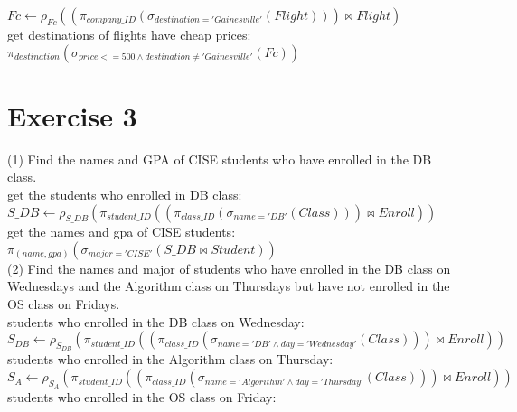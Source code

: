 \documentclass[]{article}
\begin{document}
	$Fc\leftarrow \rho_{Fc}((\pi_{company\_ID}(\sigma_{destination='Gainesville'}(Flight)))\bowtie Flight)$\\
	
	get destinations of flights have cheap prices:\\
	
	$\pi_{destination}(\sigma_{price<=500\wedge destination\neq'Gainesville'}(Fc))$\\
	
	\clearpage
	\section{Exercise 3}
	
	\noindent(1) Find the names and GPA of CISE students who have enrolled in the DB class.\\
	
	get the students who enrolled in DB class:\\
	
	$S\_DB\leftarrow \rho_{S\_DB}(\pi_{student\_ID}((\pi_{class\_ID}(\sigma_{name='DB'}(Class)))\bowtie Enroll))$\\
	
	get the names and gpa of CISE students:\\
	
	$\pi_{(name,gpa)}(\sigma_{major='CISE'}(S\_DB\bowtie Student))$\\
	
	\noindent(2) Find the names and major of students who have enrolled in the DB class on 
	Wednesdays and the Algorithm class on Thursdays but have not enrolled in the OS class on 
	Fridays.\\
	
	students who enrolled in the DB class on Wednesday:\\
	
	$S_{DB}\leftarrow \rho_{S_{DB}}(\pi_{student\_ID}((\pi_{class\_ID}(\sigma_{name='DB'\wedge day='Wednesday'}(Class)))\bowtie Enroll))$\\
	
	students who enrolled in the Algorithm class on Thursday:\\
	
	$S_{A}\leftarrow \rho_{S_{A}}(\pi_{student\_ID}((\pi_{class\_ID}(\sigma_{name='Algorithm'\wedge day='Thursday'}(Class)))\bowtie Enroll))$\\
	
	students who enrolled in the OS class on Friday:\\
	
\end{document}
